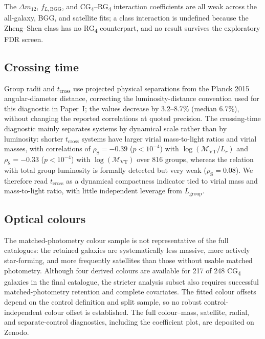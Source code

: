 \documentclass{aa}
\newcommand{\CG}{CG\textsubscript{4}}
\newcommand{\RG}{RG\textsubscript{4}}
\begin{document}
\begin{appendix}
\begin{table}
\begin{tabular}{lllc}
\hline
\end{tabular}
\end{table}

The \(\Delta m_{12}\), \(f_{L,\mathrm{BGG}}\), and \CG{}--\RG{} interaction coefficients are all weak across the all-galaxy, BGG, and satellite fits; a class interaction is undefined because the Zheng--Shen class has no \RG{} counterpart, and no result survives the exploratory FDR screen.


\subsection{Crossing time}\label{app:crossing_time}







Group radii and \(t_\mathrm{cross}\) use projected physical separations from the Planck 2015 angular-diameter distance, correcting the luminosity-distance convention used for this diagnostic in Paper~I; the values decrease by 3.2--8.7\% (median 6.7\%), without changing the reported correlations at quoted precision. The crossing-time diagnostic mainly separates systems by dynamical scale rather than by luminosity: shorter \(t_\mathrm{cross}\) systems have larger virial mass-to-light ratios and virial masses, with correlations of \(\rho_\mathrm{S}=-0.39\) (\(p<10^{-4}\)) with \(\log(\mathcal{M}_\mathrm{VT}/L_r)\) and \(\rho_\mathrm{S}=-0.33\) (\(p<10^{-4}\)) with \(\log(\mathcal{M}_\mathrm{VT})\) over 816 groups, whereas the relation with total group luminosity is formally detected but very weak (\(\rho_\mathrm{S}=0.08\)). We therefore read \(t_\mathrm{cross}\) as a dynamical compactness indicator tied to virial mass and mass-to-light ratio, with little independent leverage from \(L_\mathrm{group}\).
\FloatBarrier
\subsection{Optical colours}\label{sec:optical_colours}

The matched-photometry colour sample is not representative of the full catalogues: the retained galaxies are systematically less massive, more actively star-forming, and more frequently satellites than those without usable matched photometry. Although four derived colours are available for 217 of 248 \CG{} galaxies in the final catalogue, the stricter analysis subset also requires successful matched-photometry retention and complete covariates. The fitted colour offsets depend on the control definition and split sample, so no robust control-independent colour offset is established. The full colour--mass, satellite, radial, and separate-control diagnostics, including the coefficient plot, are deposited on Zenodo.
\fi



\end{appendix}
\end{document}
